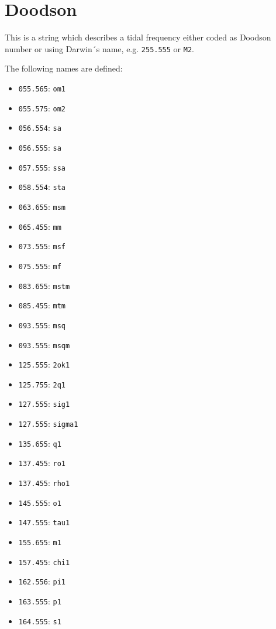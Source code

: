 \clearpage

\section{Doodson}\label{doodson}
This is a string which describes a tidal frequency either coded as Doodson number
or using Darwin´s name, e.g. \verb|255.555| or \verb|M2|.

The following names are defined:
\begin{itemize}
\item \verb|055.565|: \verb|om1|  \item \verb|055.575|: \verb|om2|     \item \verb|056.554|: \verb|sa|
\item \verb|056.555|: \verb|sa|   \item \verb|057.555|: \verb|ssa|     \item \verb|058.554|: \verb|sta|
\item \verb|063.655|: \verb|msm|  \item \verb|065.455|: \verb|mm|      \item \verb|073.555|: \verb|msf|
\item \verb|075.555|: \verb|mf|   \item \verb|083.655|: \verb|mstm|    \item \verb|085.455|: \verb|mtm|
\item \verb|093.555|: \verb|msq|  \item \verb|093.555|: \verb|msqm|    \item \verb|125.555|: \verb|2ok1|
\item \verb|125.755|: \verb|2q1|  \item \verb|127.555|: \verb|sig1|    \item \verb|127.555|: \verb|sigma1|
\item \verb|135.655|: \verb|q1|   \item \verb|137.455|: \verb|ro1|     \item \verb|137.455|: \verb|rho1| \item \verb|145.555|: \verb|o1|
\item \verb|147.555|: \verb|tau1| \item \verb|155.655|: \verb|m1|      \item \verb|157.455|: \verb|chi1|
\item \verb|162.556|: \verb|pi1|  \item \verb|163.555|: \verb|p1|      \item \verb|164.555|: \verb|s1|

\end{itemize}
